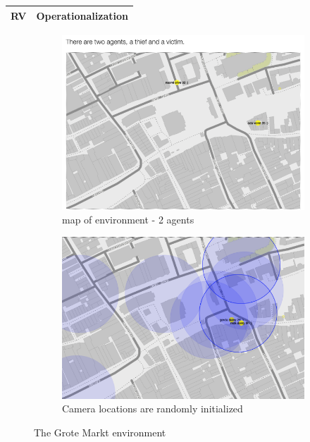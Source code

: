 \begin{adjustbox}{center}
\footnotesize
\begin{tabular}{|l|l|}
 \hline
 RV &Operationalization\\
 \hline
\hline
\end{tabular}
\end{adjustbox}



\begin{figure}[htbp]
\begin{center}
\begin{subfigure}{.5\textwidth}
\includegraphics[width=\linewidth]{images/grotemarktmap.png}
\caption{map of environment - 2 agents}
\end{subfigure}%
\begin{subfigure}{.5\textwidth}
\includegraphics[width=\linewidth]{images/grotemarktCameras.png}
\caption{Camera locations are randomly initialized}
\end{subfigure}%
\label{groteMarkt}
\caption{The Grote Markt environment}
\end{center}
\end{figure}



